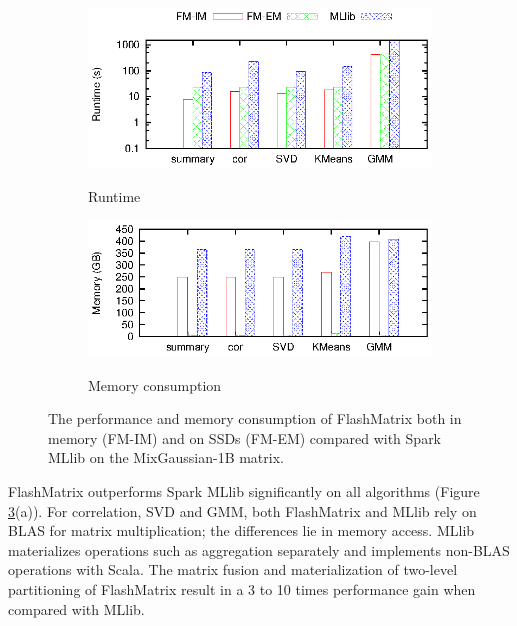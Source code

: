 \begin{figure}
  \vspace{-5pt}
	\centering
	\footnotesize
	\begin{subfigure}{.5\textwidth}
		\includegraphics{FlashMatrix_figs/FM-vs-spark.eps}
		\label{perf:rt}
		\vspace{-12pt}
		\caption{Runtime}
	\end{subfigure}

	\vspace{3pt}
	\begin{subfigure}{.5\textwidth}
		\includegraphics{FlashMatrix_figs/FM-vs-spark-mem.eps}
		\label{perf:mem}
		\vspace{-12pt}
		\caption{Memory consumption}
	\end{subfigure}
	\caption{The performance and memory consumption of FlashMatrix both
		in memory (FM-IM) and on SSDs (FM-EM) compared with Spark MLlib
		on the MixGaussian-1B matrix.}
	\label{perf:fm}
  \vspace{-10pt}
\end{figure}

FlashMatrix outperforms Spark MLlib significantly
on all algorithms (Figure \ref{perf:fm}(a)). For 
correlation, SVD and GMM, both FlashMatrix and MLlib
rely on BLAS for matrix multiplication; the differences lie in memory access.
MLlib materializes operations such as aggregation separately and implements
non-BLAS operations with Scala. The matrix fusion and materialization of
two-level partitioning of FlashMatrix result in a 3 to 10 times performance
gain when compared with MLlib.

